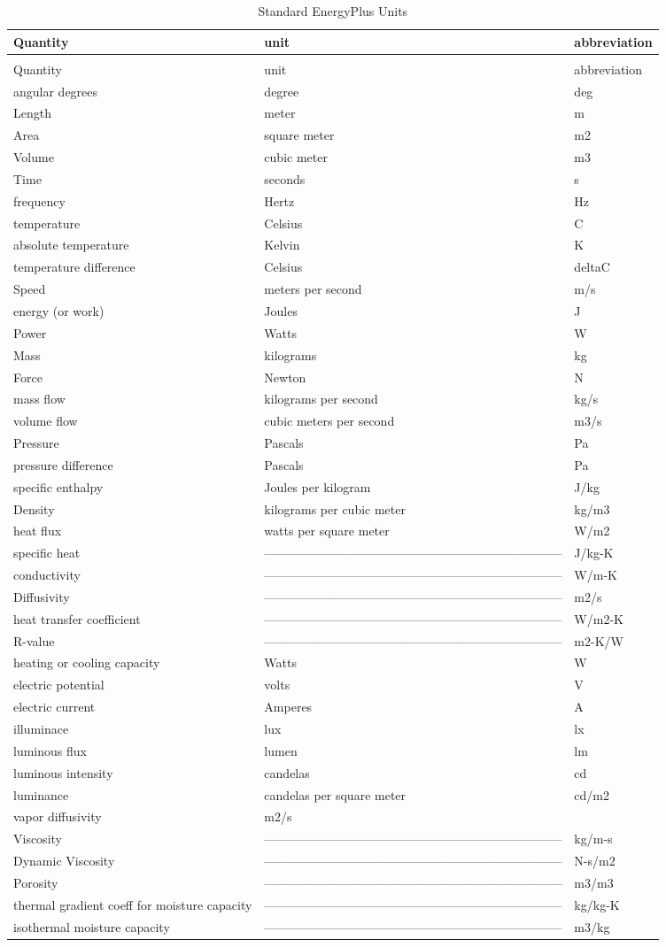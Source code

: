 \begin{longtable}[c]{p{1.59in}p{2.9in}p{1.5in}}
\caption{Standard EnergyPlus Units \label{table:standard-energyplus-units}} \tabularnewline
\toprule
Quantity & unit & abbreviation \tabularnewline
\midrule
\endfirsthead

\caption[]{Standard EnergyPlus Units} \tabularnewline
\toprule
Quantity & unit & abbreviation \tabularnewline
\midrule
\endhead

angular degrees & degree & deg \tabularnewline
Length & meter & m \tabularnewline
Area & square meter & m2 \tabularnewline
Volume & cubic meter & m3 \tabularnewline
Time & seconds & s \tabularnewline
frequency & Hertz & Hz \tabularnewline
temperature & Celsius & C \tabularnewline
absolute temperature & Kelvin & K \tabularnewline
temperature difference & Celsius & deltaC \tabularnewline
Speed & meters per second & m/s \tabularnewline
energy (or work) & Joules & J \tabularnewline
Power & Watts & W \tabularnewline
Mass & kilograms & kg \tabularnewline
Force & Newton & N \tabularnewline
mass flow & kilograms per second & kg/s \tabularnewline
volume flow & cubic meters per second & m3/s \tabularnewline
Pressure & Pascals & Pa \tabularnewline
pressure difference & Pascals & Pa \tabularnewline
specific enthalpy & Joules per kilogram & J/kg \tabularnewline
Density & kilograms per cubic meter & kg/m3 \tabularnewline
heat flux & watts per square meter & W/m2 \tabularnewline
specific heat & ------------------------------------------------------------------------ & J/kg-K \tabularnewline
conductivity & ------------------------------------------------------------------------ & W/m-K \tabularnewline
Diffusivity & ------------------------------------------------------------------------ & m2/s \tabularnewline
heat transfer coefficient & ------------------------------------------------------------------------ & W/m2-K \tabularnewline
R-value & ------------------------------------------------------------------------ & m2-K/W \tabularnewline
heating or cooling capacity & Watts & W \tabularnewline
electric potential & volts & V \tabularnewline
electric current & Amperes & A \tabularnewline
illuminace & lux & lx \tabularnewline
luminous flux & lumen & lm \tabularnewline
luminous intensity & candelas & cd \tabularnewline
luminance & candelas per square meter & cd/m2 \tabularnewline
vapor diffusivity & m2/s & ~ \tabularnewline
Viscosity & ------------------------------------------------------------------------ & kg/m-s \tabularnewline
Dynamic Viscosity & ------------------------------------------------------------------------ & N-s/m2 \tabularnewline
Porosity & ------------------------------------------------------------------------ & m3/m3 \tabularnewline
thermal gradient coeff for moisture capacity & ------------------------------------------------------------------------ & kg/kg-K \tabularnewline
isothermal moisture capacity & ------------------------------------------------------------------------ & m3/kg \tabularnewline
\bottomrule
\end{longtable}
